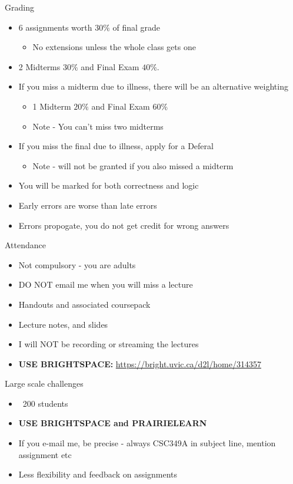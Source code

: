 \documentclass[12pt]{beamer}
\begin{document}
\begin{frame}{Grading} 
\begin{itemize} 
\item{6 assignments worth $30\%$ of final grade}
\begin{itemize} 
\item{No extensions unless the whole class gets one}
\end{itemize}
\item{2 Midterms $30\%$ and Final Exam $40\%$.}
\item{If you miss a midterm due to illness, there will be an alternative weighting}
\begin{itemize} 
\item{1 Midterm $20\%$ and Final Exam $60\%$}
\item{Note - You can't miss two midterms}
\end{itemize}
\item{If you miss the final due to illness, apply for a Deferal}
\begin{itemize} 
\item{Note - will not be granted if you also missed a midterm}
\end{itemize} 
\item{You will be marked for both correctness and logic}
\item{Early errors are worse than late errors}
\item{Errors propogate, you do not get credit for wrong answers}
\end{itemize} 
\end{frame} 

\begin{frame}{Attendance} 
\begin{itemize}
\item{Not compulsory - you are adults} 
\item{DO NOT email me when you will miss a lecture} 
\item{Handouts and associated coursepack} 
\item{Lecture notes, and slides}
\item{I will NOT be recording or streaming the lectures}
\item{{\bf USE BRIGHTSPACE:} \url{https://bright.uvic.ca/d2l/home/314357}}
\end{itemize}
\end{frame} 

\begin{frame}{Large scale challenges} 
\begin{itemize} 
\item{~200 students} 
\item{{\bf USE BRIGHTSPACE and PRAIRIELEARN}} 
\item{If you e-mail me, be precise - always CSC349A in subject line, mention assignment etc} 
\item{Less flexibility and feedback on assignments}
\end{itemize}
\end{frame} 
\end{document}
